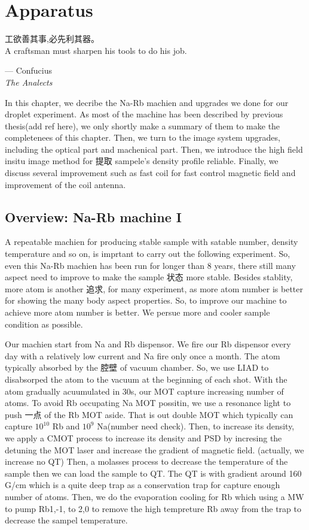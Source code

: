 \chapter{Apparatus}
\label{Chap_Apparatus}

\setlength{\unitlength}{1pt}
\setlength{\epigraphwidth}{10cm}
\epigraph{工欲善其事,必先利其器。\\ A craftsman must sharpen his tools to do his job.}{--- Confucius\\ \textit{The Analects}}

In this chapter, we decribe the Na-Rb machien and upgrades we done for our droplet experiment. As most of the machine has been described by previous thesis(add ref here), we only shortly make a summary of them to make the completenees of this chapter. Then, we turn to the image system upgrades, including the optical part and machenical part. Then, we introduce the high field insitu image method for 提取 sampele's density profile reliable. Finally, we discuss several improvement such as fast coil for fast control magnetic field and improvement of the coil antenna.

\section{Overview: Na-Rb machine I}
A repeatable machien for producing stable sample with satable number, density temperature and so on, is imprtant to carry out the following experiment. So, even this Na-Rb machien has been run for longer than 8 years, there still many aspect need to improve to make the sample 状态  more stable. Besides stablity, more atom is another 追求, for many experiment, as more atom number is better for showing the many body aspect properties. So, to improve our machine to achieve more atom number is better. We persue more and cooler sample condition as possible. 

Our machien start from Na and Rb dispensor. We fire our Rb dispensor every day with a relatively low  current and Na fire only once a month. The atom typically absorbed by the 腔壁 of vacuum chamber. So, we use LIAD to disabsorped the atom to the vacuum at the beginning of each shot. With the atom gradually acuumulated in 30s, our MOT capture increasing number of atoms. To avoid Rb occupating Na MOT possitin, we use a resonance light to push 一点 of the Rb MOT aside. That is out double MOT which typically can capture $10^{10}$ Rb and $10^{9}$ Na(number need check). Then, to increase its density, we apply a CMOT process to increase its density and PSD by incresing the detuning the MOT laser and increase the gradient of magnetic field. (actually, we increase no QT) Then, a molasses process to decrease the temperature of the sample then we can load the sample to QT. The QT is with gradient around 160 G/cm which is a quite deep trap as a conservation trap for capture enough number of atoms. Then, we do the evaporation cooling for Rb which using a MW to pump Rb1,-1, to 2,0 to remove the high tempreture Rb away from the trap to decrease the sampel temperature. 


